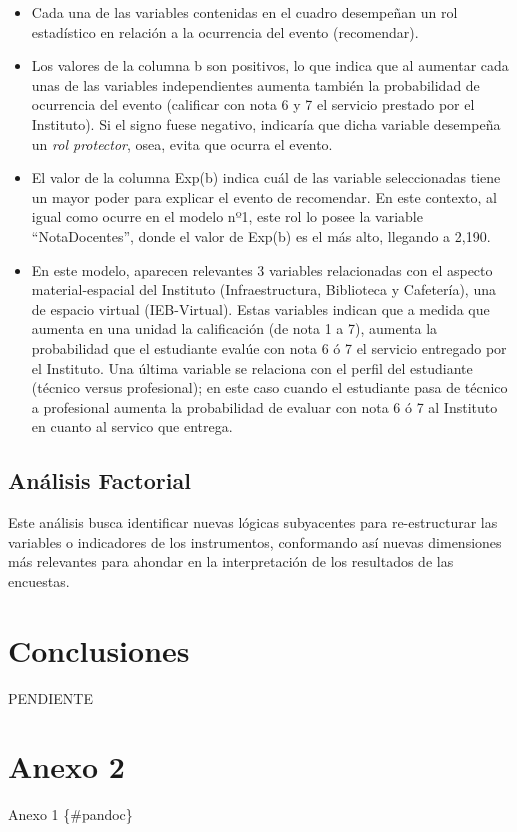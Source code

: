 \documentclass[]{book}
\begin{document}
\begin{itemize}
\item
  Cada una de las variables contenidas en el cuadro desempeñan un rol
  estadístico en relación a la ocurrencia del evento (recomendar).
\item
  Los valores de la columna b son positivos, lo que indica que al
  aumentar cada unas de las variables independientes aumenta también la
  probabilidad de ocurrencia del evento (calificar con nota 6 y 7 el
  servicio prestado por el Instituto). Si el signo fuese negativo,
  indicaría que dicha variable desempeña un \emph{rol protector}, osea,
  evita que ocurra el evento.
\item
  El valor de la columna Exp(b) indica cuál de las variable
  seleccionadas tiene un mayor poder para explicar el evento de
  recomendar. En este contexto, al igual como ocurre en el modelo nº1,
  este rol lo posee la variable ``NotaDocentes'', donde el valor de
  Exp(b) es el más alto, llegando a 2,190.
\item
  En este modelo, aparecen relevantes 3 variables relacionadas con el
  aspecto material-espacial del Instituto (Infraestructura, Biblioteca y
  Cafetería), una de espacio virtual (IEB-Virtual). Estas variables
  indican que a medida que aumenta en una unidad la calificación (de
  nota 1 a 7), aumenta la probabilidad que el estudiante evalúe con nota
  6 ó 7 el servicio entregado por el Instituto. Una última variable se
  relaciona con el perfil del estudiante (técnico versus profesional);
  en este caso cuando el estudiante pasa de técnico a profesional
  aumenta la probabilidad de evaluar con nota 6 ó 7 al Instituto en
  cuanto al servico que entrega.
\end{itemize}

\section{Análisis Factorial}\label{analisis-factorial}

Este análisis busca identificar nuevas lógicas subyacentes para
re-estructurar las variables o indicadores de los instrumentos,
conformando así nuevas dimensiones más relevantes para ahondar en la
interpretación de los resultados de las encuestas.

\chapter{Conclusiones}\label{conclusiones}

PENDIENTE

\appendix


\chapter{Anexo 2}\label{rmarkdown}

Anexo 1 \{\#pandoc\}


\end{document}
